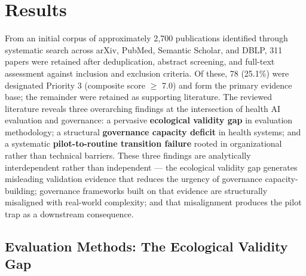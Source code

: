 
\section{Results}
\label{sec:results}


From an initial corpus of approximately 2,700 publications identified through systematic
search across arXiv, PubMed, Semantic Scholar, and DBLP, 311
papers were retained after deduplication, abstract screening, and full-text
assessment against inclusion and exclusion criteria. Of these, 78 (25.1\%)
were designated Priority 3 (composite score $\geq$ 7.0) and form the primary evidence
base; the remainder were retained as supporting literature. The reviewed literature
reveals three overarching findings at the intersection of health AI
evaluation and governance: a pervasive \textbf{ecological validity gap}
in evaluation methodology; a structural \textbf{governance capacity deficit}
in health systems; and a systematic \textbf{pilot-to-routine transition
failure} rooted in organizational rather than technical barriers. These three
findings are analytically interdependent rather than independent — the
ecological validity gap generates misleading validation evidence that reduces
the urgency of governance capacity-building; governance frameworks built on
that evidence are structurally misaligned with real-world complexity; and
that misalignment produces the pilot trap as a downstream consequence.


\subsection{Evaluation Methods: The Ecological Validity Gap}
\label{sec:results_evaluation}

